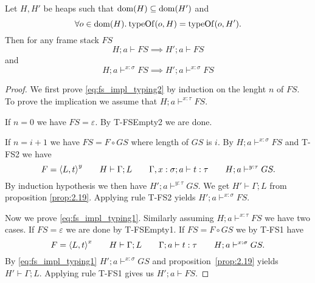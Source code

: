 \begin{proposition} \label{prop:2.14}
  Let $H, H'$ be heaps such that $\mbox{$\mathrm{dom}$}{(H)} \subseteq \mbox{$\mathrm{dom}$}{(H')}$ and 
  \begin{equation*}
    \forall o \in \mbox{$\mathrm{dom}$}{(H)}. \: \mbox{$\mathrm{typeOf}$}{(o, H)} = \mbox{$\mathrm{typeOf}$}{(o, H')}.
  \end{equation*}
  Then for any frame stack $FS$
  \begin{equation}\label{eq:fs_impl_typing1}
    H; a \vdash FS \implies H'; a \vdash FS
  \end{equation}
  and
  \begin{equation} \label{eq:fs_impl_typing2}
    H; a \vdash^{x :\sigma} FS \implies H'; a \vdash^{x: \sigma} FS 
  \end{equation}
\end{proposition}

\begin{proof}
  We first prove \eqref{eq:fs_impl_typing2} by induction on the lenght $n$ of
  $FS$. To prove the implication we assume that $H; a \vdash^{x: \tau} FS$.
  
  If $n = 0$ we have $FS = \varepsilon$. By {\sc T-FSEmpty2} we are done.
  
  If $n = i + 1$ we have $FS = F \circ GS$ where length of $GS$ is $i$. By  
  $H; a \vdash^{x: \sigma} FS$ and {\sc T-FS2} we have 
  \begin{equation*}
    F = \mbox{$\langle L, t \rangle$}^{y} \quad\quad H \vdash \Gamma; L \quad\quad \mbox{$\Gamma, x:
    \sigma;a\vdash t:\tau$} \quad\quad H; a \vdash^{y: \tau} GS.
  \end{equation*}
  By induction hypothesis we then have $H'; a \vdash^{y: \tau} GS$. We get $H'
  \vdash \Gamma; L$ from proposition \ref{prop:2.19}. Applying rule {\sc T-FS2}
  yields $H'; a \vdash^{x: \sigma} FS$.

  Now we prove \eqref{eq:fs_impl_typing1}. Similarly assuming $H; a \vdash^{x:
  \tau} FS$ we have two cases. If $FS = \varepsilon$ we are done by {\sc
  T-FSEmpty1}. If $FS = F \circ GS$ we by {\sc T-FS1} have
  \begin{equation*}
    F = \mbox{$\langle L, t \rangle$}^{x} \quad\quad H \vdash \Gamma; L \quad\quad
    \mbox{$\Gamma;a\vdash t:\tau$} \quad\quad H; a \vdash^{x: \sigma} GS.
  \end{equation*}
  By \eqref{eq:fs_impl_typing1} $H'; a \vdash^{x: \sigma} GS$ and
  proposition~\ref{prop:2.19} yields $H' \vdash \Gamma; L$. Applying rule {\sc
  T-FS1} gives us $H'; a \vdash FS$.
\end{proof}

